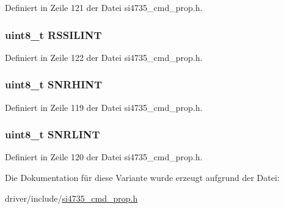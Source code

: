 Definiert in Zeile 121 der Datei si4735\+\_\+cmd\+\_\+prop.\+h.

\hypertarget{unionfm__rsq__status__resp1_ab4d0978420a010d6e43e4c2e5bca697c}{}
\subsubsection[{R\+S\+S\+I\+L\+I\+N\+T}]{\setlength{\rightskip}{0pt plus 5cm}uint8\+\_\+t R\+S\+S\+I\+L\+I\+N\+T}\label{unionfm__rsq__status__resp1_ab4d0978420a010d6e43e4c2e5bca697c}


Definiert in Zeile 122 der Datei si4735\+\_\+cmd\+\_\+prop.\+h.

\hypertarget{unionfm__rsq__status__resp1_a2cdca35f06dea322da5a107085b827a5}{}
\subsubsection[{S\+N\+R\+H\+I\+N\+T}]{\setlength{\rightskip}{0pt plus 5cm}uint8\+\_\+t S\+N\+R\+H\+I\+N\+T}\label{unionfm__rsq__status__resp1_a2cdca35f06dea322da5a107085b827a5}


Definiert in Zeile 119 der Datei si4735\+\_\+cmd\+\_\+prop.\+h.

\hypertarget{unionfm__rsq__status__resp1_a4c9935138813a5ab2dd82191c1003156}{}
\subsubsection[{S\+N\+R\+L\+I\+N\+T}]{\setlength{\rightskip}{0pt plus 5cm}uint8\+\_\+t S\+N\+R\+L\+I\+N\+T}\label{unionfm__rsq__status__resp1_a4c9935138813a5ab2dd82191c1003156}


Definiert in Zeile 120 der Datei si4735\+\_\+cmd\+\_\+prop.\+h.



Die Dokumentation für diese Variante wurde erzeugt aufgrund der Datei\+:\begin{DoxyCompactItemize}
\item 
driver/include/\hyperlink{si4735__cmd__prop_8h}{si4735\+\_\+cmd\+\_\+prop.\+h}\end{DoxyCompactItemize}
